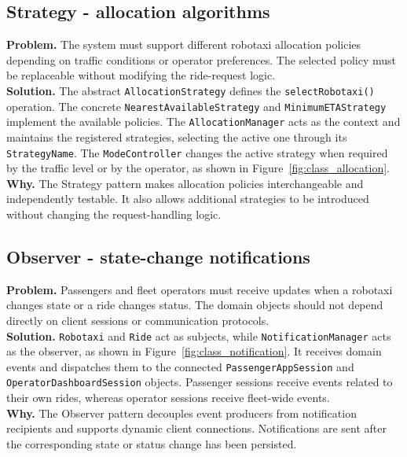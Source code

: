 \documentclass[11pt,a4paper,oneside]{report}
\newcommand{\code}[1]{\texttt{#1}}
\begin{document}
\subsection{Strategy - allocation algorithms}
\textbf{Problem.}
The system must support different robotaxi allocation policies depending
on traffic conditions or operator preferences. The selected policy must
be replaceable without modifying the ride-request logic.\\
\textbf{Solution.}
The abstract \code{AllocationStrategy} defines the
\code{selectRobotaxi()} operation. The concrete
\code{NearestAvailableStrategy} and \code{MinimumETAStrategy}
implement the available policies. The \code{AllocationManager} acts as
the context and maintains the registered strategies, selecting the
active one through its \code{StrategyName}. The
\code{ModeController} changes the active strategy when required by the
traffic level or by the operator, as shown in
Figure~\ref{fig:class_allocation}.\\
\textbf{Why.}
The Strategy pattern makes allocation policies interchangeable and
independently testable. It also allows additional strategies to be
introduced without changing the request-handling logic.

\subsection{Observer - state-change notifications}

\textbf{Problem.}
Passengers and fleet operators must receive updates when a robotaxi
changes state or a ride changes status. The domain objects should not
depend directly on client sessions or communication protocols.\\
\textbf{Solution.}
\code{Robotaxi} and \code{Ride} act as subjects, while
\code{NotificationManager} acts as the observer, as shown in Figure~\ref{fig:class_notification}. It receives domain
events and dispatches them to the connected
\code{PassengerAppSession} and \code{OperatorDashboardSession} objects.
Passenger sessions receive events related to their own rides, whereas
operator sessions receive fleet-wide events.\\
\textbf{Why.}
The Observer pattern decouples event producers from notification
recipients and supports dynamic client connections. Notifications are
sent after the corresponding state or status change has been persisted.
\end{document}
